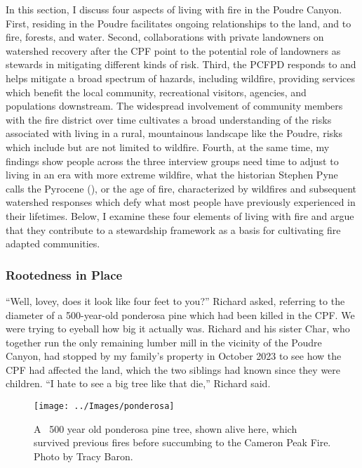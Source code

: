 \documentclass[
]{article}
\begin{document}
In this section, I discuss four aspects of living with fire in the Poudre Canyon. First, residing in the Poudre facilitates ongoing relationships to the land, and to fire, forests, and water. Second, collaborations with private landowners on watershed recovery after the CPF point to the potential role of landowners as stewards in mitigating different kinds of risk. Third, the PCFPD responds to and helps mitigate a broad spectrum of hazards, including wildfire, providing services which benefit the local community, recreational visitors, agencies, and populations downstream. The widespread involvement of community members with the fire district over time cultivates a broad understanding of the risks associated with living in a rural, mountainous landscape like the Poudre, risks which include but are not limited to wildfire. Fourth, at the same time, my findings show people across the three interview groups need time to adjust to living in an era with more extreme wildfire, what the historian Stephen Pyne calls the Pyrocene (), or the age of fire, characterized by wildfires and subsequent watershed responses which defy what most people have previously experienced in their lifetimes. Below, I examine these four elements of living with fire and argue that they contribute to a stewardship framework as a basis for cultivating fire adapted communities.

\subsubsection{Rootedness in Place}\label{rootedness-in-place}

``Well, lovey, does it look like four feet to you?'' Richard asked, referring to the diameter of a 500-year-old ponderosa pine which had been killed in the CPF. We were trying to eyeball how big it actually was. Richard and his sister Char, who together run the only remaining lumber mill in the vicinity of the Poudre Canyon, had stopped by my family's property in October 2023 to see how the CPF had affected the land, which the two siblings had known since they were children. ``I hate to see a big tree like that die,'' Richard said.

\begin{figure}
\texttt{[image: ../Images/ponderosa]} \caption[Ponderosa pine]{A ~500 year old ponderosa pine tree, shown alive here, which survived previous fires before succumbing to the Cameron Peak Fire. Photo by Tracy Baron.}\label{fig:figureTitle13}
\end{figure}
\end{document}

